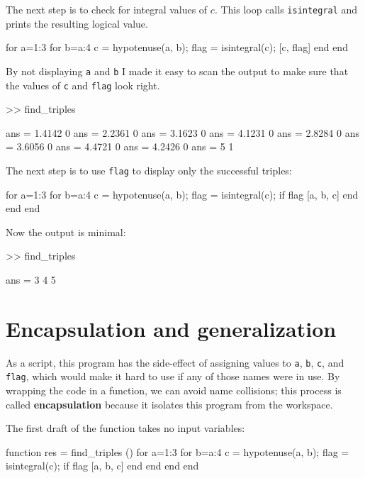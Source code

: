 \documentclass[
]{book}
\numberwithin{Answer}{chapter}
\numberwithin{Exercise}{chapter}
\begin{document}
The next step is to check for integral values of $c$.  This
loop calls {\tt isintegral} and prints the resulting logical
value.

\begin{code}
for a=1:3
    for b=a:4
        c = hypotenuse(a, b);
        flag = isintegral(c);
        [c, flag]
    end
end
\end{code}

By not displaying {\tt a} and {\tt b} I made it easy to scan the
output to make sure that the values of {\tt c} and {\tt flag}
look right.

\begin{code}
>> find_triples

ans = 1.4142         0
ans = 2.2361         0
ans = 3.1623         0
ans = 4.1231         0
ans = 2.8284         0
ans = 3.6056         0
ans = 4.4721         0
ans = 4.2426         0
ans = 5              1
\end{code}

The next step is to use {\tt flag} to display only the successful
triples:

\begin{code}
for a=1:3
    for b=a:4
        c = hypotenuse(a, b);
        flag = isintegral(c);
        if flag
            [a, b, c]
        end
    end
end
\end{code}

Now the output is minimal:

\begin{code}
>> find_triples

ans = 3     4     5
\end{code}




\section{Encapsulation and generalization}

As a script, this program has the side-effect of assigning values to
{\tt a}, {\tt b}, {\tt c}, and {\tt flag}, which would make it hard to
use if any of those names were in use.  
By wrapping the code in a function, we can avoid name collisions; this process is called {\bf encapsulation} because it isolates this program from the workspace.


The first draft of the function takes no input variables:

\begin{code}
function res = find_triples ()
    for a=1:3
        for b=a:4
            c = hypotenuse(a, b);
            flag = isintegral(c);
            if flag
                [a, b, c]
            end
        end
    end
end
\end{code}
\end{document}
